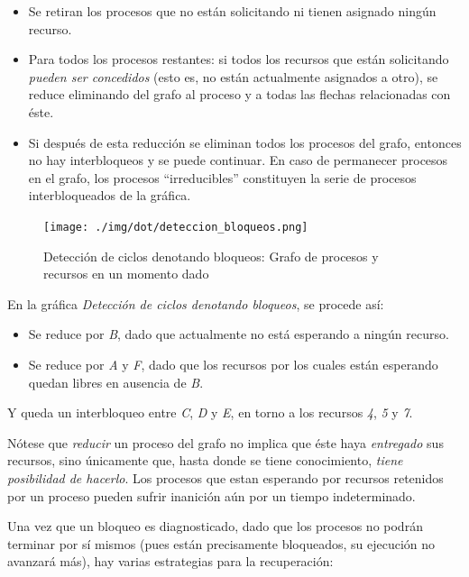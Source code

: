 \documentclass[11pt,fleqn]{book} %
\begin{document}
\begin{itemize}
\item Se retiran los procesos que no están solicitando ni tienen asignado
  ningún recurso.
\item Para todos los procesos restantes: si todos los recursos que están
  solicitando \emph{pueden ser concedidos} (esto es, no están actualmente
  asignados a otro), se reduce eliminando del grafo al proceso y a
  todas las flechas relacionadas con éste.
\item Si después de esta reducción se eliminan todos los procesos del
  grafo, entonces no hay interbloqueos y se puede continuar. En caso de
  permanecer procesos en el grafo, los procesos “irreducibles”
  constituyen la serie de procesos interbloqueados de la gráfica.
\end{itemize}

\begin{figure}[htb]
\centering
\texttt{[image: ./img/dot/deteccion\_bloqueos.png]}
\caption{\label{PROC_deteccion_bloqueos}Detección de ciclos denotando bloqueos: Grafo de procesos y recursos en un momento dado}
\end{figure}

En la gráfica \emph{Detección de ciclos denotando bloqueos}, se procede así:

\begin{itemize}
\item Se reduce por \emph{B}, dado que actualmente no está esperando a ningún
  recurso.
\item Se reduce por \emph{A} y \emph{F}, dado que los recursos por los cuales están
  esperando quedan libres en ausencia de \emph{B}.
\end{itemize}

Y queda un interbloqueo entre \emph{C}, \emph{D} y \emph{E}, en torno a los
recursos \emph{4}, \emph{5} y \emph{7}.

Nótese que \emph{reducir} un proceso del grafo no implica que éste haya
\emph{entregado} sus recursos, sino únicamente que, hasta donde se tiene
conocimiento, \emph{tiene posibilidad de hacerlo}. Los procesos que estan
esperando por recursos retenidos por un proceso pueden sufrir
inanición aún por un tiempo indeterminado.

Una vez que un bloqueo es diagnosticado, dado que los procesos no
podrán terminar por sí mismos (pues están precisamente bloqueados,
su ejecución no avanzará más), hay varias estrategias para la
recuperación:
\end{document}
